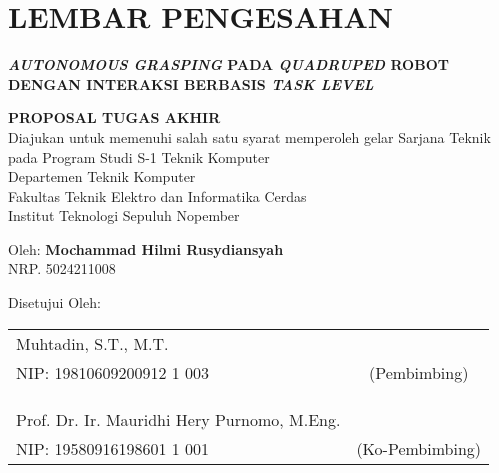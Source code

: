 \chapter*{LEMBAR PENGESAHAN}

\thispagestyle{empty}

\begin{center}
  \textbf{\emph{AUTONOMOUS GRASPING} PADA \emph{QUADRUPED} ROBOT DENGAN INTERAKSI BERBASIS \emph{TASK LEVEL}}
\end{center}

\begingroup
\small

\begin{center}
  \textbf{PROPOSAL TUGAS AKHIR} \\
  Diajukan untuk memenuhi salah satu syarat memperoleh gelar
  Sarjana Teknik pada
  Program Studi S-1 Teknik Komputer \\
  Departemen Teknik Komputer \\
  Fakultas Teknik Elektro dan Informatika Cerdas \\
  Institut Teknologi Sepuluh Nopember
\end{center}

\begin{center}
  Oleh: \textbf{Mochammad Hilmi Rusydiansyah} \\
  NRP. 5024211008
\end{center}

\begin{center}
  Disetujui Oleh:
\end{center}

\vspace{10ex}

\begingroup
\setlength{\tabcolsep}{0pt}

\noindent
\begin{tabularx}{\textwidth}{X c}
  Muhtadin, S.T., M.T.      &                 \\
  NIP: 19810609200912 1 003    & (Pembimbing)    \\
                                &                 \\
                                &                 \\
                                &                 \\
  Prof. Dr. Ir. Mauridhi Hery Purnomo, M.Eng. &                 \\
  NIP: 19580916198601 1 001    & (Ko-Pembimbing) \\
\end{tabularx}
\endgroup

